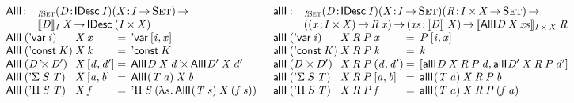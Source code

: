 \begin{figure*}

\[
\begin{array}{ll}
\stk{
\begin{array}{@{}ll}
\AllI{\!}{\!}{\!}{\!} : & _{\Bhab{\V{I}}{\Set}}
                          \PITEL{\V{D}}{\IDesc{\V{I}}}
                          \PI{\V{X}}{\V{I} \To \Set} \\
                        & \idescop{\V{D}}{\V{I}}{\V{X}} \To
                          \IDesc{(\TIMES{\V{I}}{\V{X}})}
\end{array} \\
\begin{array}{@{}l@{}l@{\:=\:\:}l}
\AllI{\:}{(\DVar{\V{i}})}{& \V{X}}{\V{x}} &
    \DVar{\pair{\V{i}}{\V{x}}{}} \\
\AllI{\:}{(\DConst{\V{K}})}{& \V{X}}{\V{k}} &
    \DConst{K} \\
\AllI{\:}{(\DProd{\V{D}}{\V{D'}})}{& \V{X}}{\pair{\V{d}}{\V{d'}}{}} &
    \DProd{\AllI{}{\V{D}}{\V{X}}{\V{d}}}{\AllI{}{\V{D'}}{\V{X}}{\V{d'}}} \\
\AllI{\:}{(\DSigma{\V{S}}{\V{T}})}{& \V{X}}{\pair{\V{a}}{\V{b}}{}} &
    \AllI{}{(\V{T}\: \V{a})}{\V{X}}{\V{b}} \\
\AllI{\:}{(\DPi{\V{S}}{\V{T}})}{& \V{X}}{\V{f}} &
    \DPi{\V{S}}{(\LAM{s} \AllI{}{(\V{T}\: \V{s})}{\V{X}}{(\V{f}\: \V{s})})}
\end{array}
}
&
\stk{
\begin{array}{@{}ll}
\allI{\!}{\!}{\!}{\!}{\!}{\!} : & _{\Bhab{\V{I}}{\Set}}
                                  \PITEL{\V{D}}{\IDesc{\V{I}}}
                                  \PITEL{\V{X}}{\V{I} \To \Set} 
                                  \PI{\V{R}}{\TIMES{\V{I}}{\V{X}} \To \Set} \\
                                & (\PI{\V{x}}{\TIMES{\V{I}}{\V{X}}} \V{R}\: \V{x}) \To
                                  \PI{\V{xs}}{\idescop{\V{D}}{}{\V{X}}} 
                                  \idescop{\AllI{}{\V{D}}{\V{X}}{\V{xs}}}{\TIMES{\V{I}}{\V{X}}}{\V{R}}
\end{array} \\
\begin{array}{@{}l@{}l@{\:=\:\:}l}
\allI{\:}{(\DVar{\V{i}})}{& \V{X}}{\V{R}}{\V{P}}{\V{x}} &
    \V{P}\: \pair{\V{i}}{\V{x}}{} \\
\allI{\:}{(\DConst{\V{K}})}{& \V{X}}{\V{R}}{\V{P}}{\V{k}} &
    \V{k} \\
\allI{\:}{(\DProd{\V{D}}{\V{D'}})}{& \V{X}}{\V{R}}{\V{P}}{(\V{d}, \V{d'})} &
    \pair{\allI{}{\V{D}}{\V{X}}{\V{R}}{\V{P}}{\V{d}}}
         {\allI{}{\V{D'}}{\V{X}}{\V{R}}{\V{P}}{\V{d'}}}{} \\
\allI{\:}{(\DSigma{\V{S}}{\V{T}})}{& \V{X}}{\V{R}}{\V{P}}{\pair{\V{a}}{\V{b}}{}} &
    \allI{}{(\V{T}\: \V{a})}{\V{X}}{\V{R}}{\V{P}}{\V{b}} \\
\allI{\:}{(\DPi{\V{S}}{\V{T}})}{& \V{X}}{\V{R}}{\V{P}}{\V{f}} &
    \allI{}{(\V{T}\: \V{a})}{\V{X}}{\V{R}}{\V{P}}{(\V{f}\: \V{a})}
\end{array}
\end{array}
}
\]


\end{figure*}
